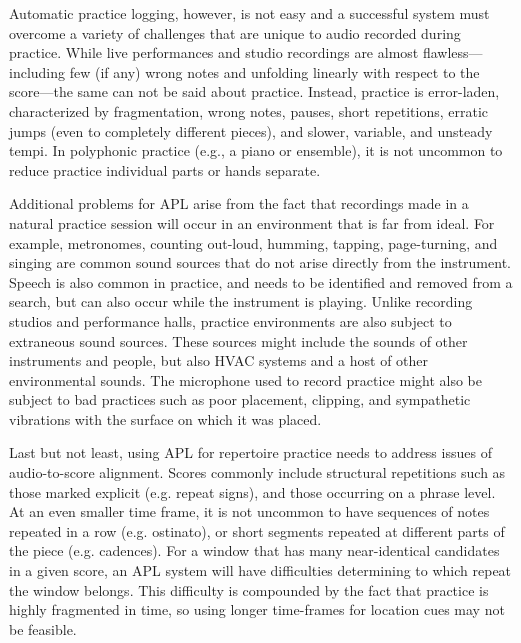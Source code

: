 \documentclass{article}
\begin{document}
Automatic practice logging, however, is not easy and a successful system must overcome a variety of challenges that are unique to audio recorded during practice. 
While live performances and studio recordings are almost flawless---including few (if any) wrong notes and unfolding linearly with respect to the score---the same can not be said about practice. 
Instead, practice is error-laden, characterized by fragmentation, wrong notes, pauses, short repetitions, erratic jumps (even to completely different pieces), and slower, variable, and unsteady tempi. 
In polyphonic practice (e.g., a piano or ensemble), it is not uncommon to reduce practice individual parts or hands separate. 

Additional problems for APL arise from the fact that recordings made in a natural practice session will occur in an environment that is far from ideal. 
For example, metronomes, counting out-loud, humming, tapping, page-turning, and singing are common sound sources that do not arise directly from the instrument. 
Speech is also common in practice, and needs to be identified and removed from a search, but can also occur while the instrument is playing.
Unlike recording studios and performance halls, practice environments are also subject to extraneous sound sources. 
These sources might include the sounds of other instruments and people, but also HVAC systems and a host of other environmental sounds.
The microphone used to record practice might also be subject to bad practices such as poor placement, clipping, and sympathetic vibrations with the surface on which it was placed. 

Last but not least, using APL for repertoire practice needs to address issues of audio-to-score alignment. 
Scores commonly include structural repetitions such as those marked explicit (e.g. repeat signs), and those occurring on a phrase level. At an even smaller time frame, it is not uncommon to have sequences of notes repeated in a row (e.g. ostinato), or short segments repeated at different parts of the piece (e.g. cadences).  
For a window that has many near-identical candidates in a given score, an APL system will have difficulties determining to which repeat the window belongs. 
This difficulty is compounded by the fact that practice is highly fragmented in time, so using longer time-frames for location cues may not be feasible.
\end{document}
